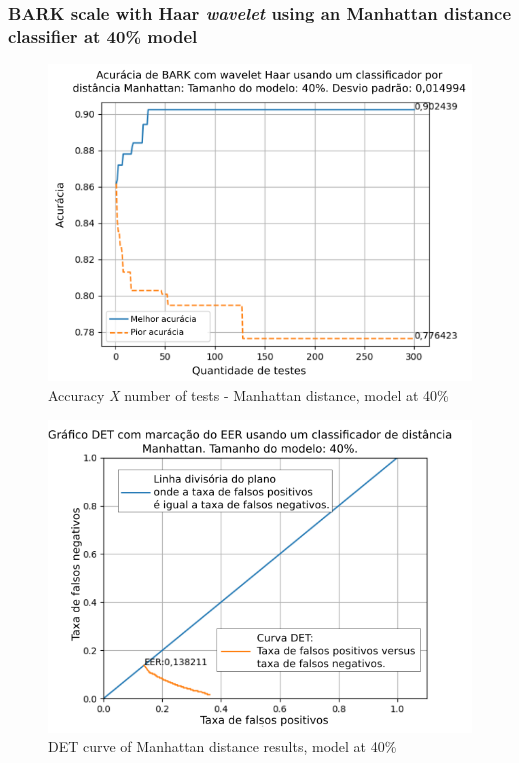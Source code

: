		\subsubsection{BARK scale with Haar \textit{wavelet} using an Manhattan distance classifier at 40\% model}
			
			
			
			\begin{figure}[!ht]
				\centering
				\includegraphics[width=\linewidth]{images/results/confusionMatrices/classifier_Manhattan_40.png}
				\caption{Accuracy \textit{X} number of tests - Manhattan distance, model at 40\%}
				\label{fig:classifiermanhattan40}
			\end{figure}
			
			\begin{figure}[!h]
				\centering
				\includegraphics[width=.9\linewidth]{images/results/det/DET_for_classifier_Manhattan_40}
				\caption{DET curve of Manhattan distance results, model at 40\%}
				\label{fig:detforclassifiermanhattan40}
			\end{figure}
		
